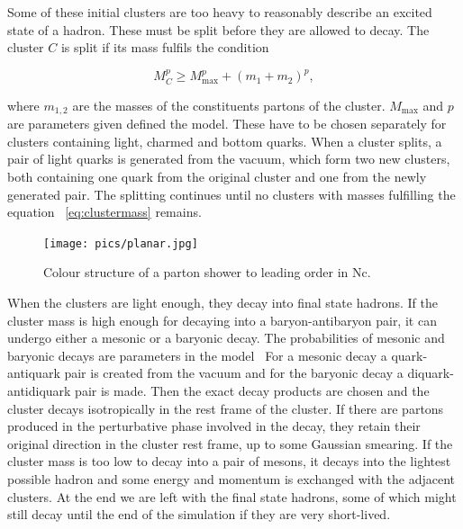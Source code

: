 Some of these initial clusters are too heavy to reasonably describe an excited state of a hadron. These must be
split before they are allowed to decay. The cluster $C$ is split if its mass fulfils the condition~\cite{herwigManual}

\begin{equation}
M_C^p \geq M_\mathrm{max}^p  + \left( m_1 + m_2\right)^p,
\label{eq:clustermass}
\end{equation}

\noindent where $m_{1,2}$ are the masses of the constituents partons of the cluster. $M_\mathrm{max}$ and $p$ are parameters given defined the model. These have to be chosen separately for clusters containing light, charmed and bottom quarks. When a cluster splits, a pair of light quarks is generated from the vacuum, which form two new clusters, both containing one quark from the original cluster and one from the newly generated pair. The splitting continues until no clusters with masses fulfilling the equation ~\ref{eq:clustermass} remains.

\begin{figure}
\centering
\texttt{[image: pics/planar.jpg]}
\caption[]{ Colour structure of a parton shower to leading order in Nc.
\cite{eventGenerators} }
\label{fig:colourstructure}
\end{figure}

When the clusters are light enough, they decay into final state hadrons. If the cluster mass is high enough for decaying into a baryon-antibaryon pair, it can undergo either a mesonic or a baryonic decay. The probabilities of mesonic and baryonic decays are parameters in the model~\cite{herwigManual}
For a mesonic decay a quark-antiquark pair is created from the vacuum and for the baryonic decay a diquark-antidiquark pair is made. Then the exact decay products are chosen and the cluster decays isotropically in the rest frame of the cluster. If there are partons produced in the perturbative phase involved in the decay, they retain their original direction in the cluster rest frame, up to some Gaussian smearing. If the cluster mass is too low to decay into a pair of mesons, it decays into the lightest possible hadron and some energy and momentum is exchanged with the adjacent clusters. At the end we are left with the final state hadrons, some of which might still decay until the end of the simulation if they are very short-lived.~\cite{herwigManual} 

